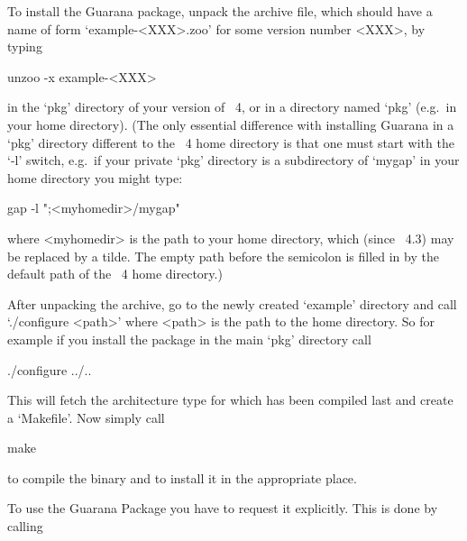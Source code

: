 


To install the {Guarana} package, unpack the archive file, which  should
have a name of form `example-<XXX>.zoo' for some version number <XXX>, by
typing

unzoo -x example-<XXX>

in the `pkg' directory of your version of {\GAP}~4,  or  in  a  directory
named `pkg' (e.g.~in your home directory). (The only essential difference
with installing {Guarana} in a `pkg' directory different to the {\GAP}~4
home directory is that one  must  start  {\GAP}  with  the  `-l'  switch,
e.g.~if your private `pkg' directory is a subdirectory of `mygap' in your
home directory you might type:

gap -l ";<myhomedir>/mygap"

where <myhomedir> is the  path  to  your  home  directory,  which  (since
{\GAP}~4.3) may be replaced  by  a  tilde.  The  empty  path  before  the
semicolon is  filled  in  by  the  default  path  of  the  {\GAP}~4  home
directory.)

After unpacking the archive, go to the newly created `example'  directory
and call `./configure <path>' where <path> is the path to the {\GAP} home
directory. So for example if you install the package in  the  main  `pkg'
directory call

\begintt
./configure ../..
\endtt

This will fetch the architecture type for which {\GAP} has been  compiled
last and create a `Makefile'. Now simply call

\begintt
make
\endtt

to compile the binary and to install it in the appropriate place.


To use the {Guarana} Package you have to request it explicitly. This  is
done by calling

